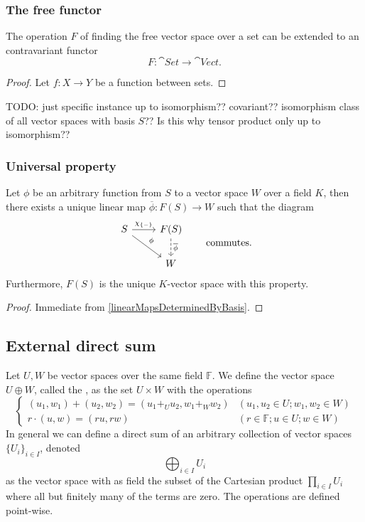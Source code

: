 \subsubsection{The free functor}
\begin{proposition}
The operation $F$ of finding the free vector space over a set can be extended to an contravariant functor
\[ F: \cat{Set} \to \cat{Vect}. \]
\end{proposition}
\begin{proof}
Let $f:X\to Y$ be a function between sets.
\end{proof}
TODO: just specific instance up to isomorphism?? covariant?? isomorphism class of all vector spaces with basis $S$?? Is this why tensor product only up to isomorphism??

\subsubsection{Universal property}
\begin{proposition} \label{universalPropertyFreeVectorSpace}
Let $\phi$ be an arbitrary function from $S$ to a vector space $W$ over a field $K$, then there exists a unique linear map $\overline{\phi}: F(S)\to W$ such that the diagram
\[ \begin{tikzcd}
S \ar[r,"\charFunc{\{-\}}"] \ar[dr,"\phi"] & F(S) \ar[d,dashed,"\overline{\phi}"] \\
& W
\end{tikzcd} \qquad \text{commutes.} \]
Furthermore, $F(S)$ is the unique $K$-vector space with this property.
\end{proposition}
\begin{proof}
Immediate from \ref{linearMapsDeterminedByBasis}.
\end{proof}

\subsection{External direct sum}
\begin{definition}
Let $U,W$ be vector spaces over the same field $\mathbb{F}$. We define the vector space  $U\oplus W$, called the , as the set $U\times W$ with the operations
\[ \begin{cases}
(u_1,w_1) + (u_2, w_2) = (u_1 +_U u_2, w_1 +_W w_2) & (u_1,u_2 \in U; w_1, w_2 \in W) \\
r\cdot (u,w) = (ru, rw) & (r\in \mathbb{F}; u\in U; w \in W)
\end{cases} \]
In general we can define a direct sum of an arbitrary collection of vector spaces $\{U_i\}_{i\in I}$, denoted
\[ \bigoplus_{i\in I}U_i \]
as the vector space with as field the subset of the Cartesian product $\prod_{i\in I}U_i$ where all but finitely many of the terms are zero. The operations are defined point-wise.
\end{definition}

